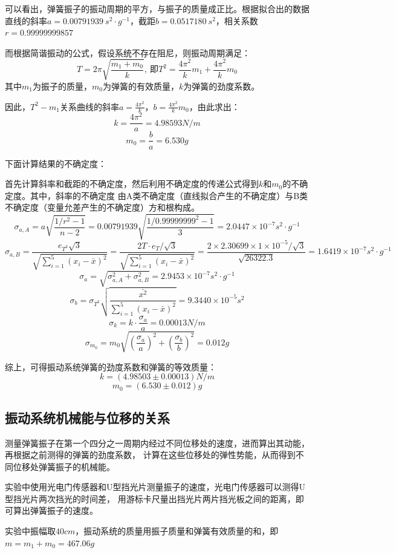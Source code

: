 \documentclass{article}
\begin{document}
    可以看出，弹簧振子的振动周期的平方，与振子的质量成正比。根据拟合出的数据直线的斜率$a=0.00791939\ s^2\cdot g^{-1}$，截距$b=0.0517180\ s^2$，相关系数$r=0.99999999857$

    而根据简谐振动的公式，假设系统不存在阻尼，则振动周期满足：
    $$T=2\pi \sqrt{\frac{m_1+m_0}{k}},\ \text{即}T^2=\frac{4\pi^2}{k}m_1+\frac{4\pi^2}{k}m_0$$
    其中$m_1$为振子的质量，$m_0$为弹簧的有效质量，$k$为弹簧的劲度系数。

    因此，$T^2-m_1$关系曲线的斜率$a=\frac{4\pi^2}{k}$，$b=\frac{4\pi^2}{k}m_0$，由此求出：
    $$k=\frac{4\pi^2}{a}=4.98593N/m$$
    $$m_0=\frac{b}{a}=6.530g$$

    下面计算结果的不确定度：

    首先计算斜率和截距的不确定度，然后利用不确定度的传递公式得到$k$和$m_0$的不确定度。其中，斜率的不确定度
    由A类不确定度（直线拟合产生的不确定度）与B类不确定度（变量允差产生的不确定度）方和根构成。
    $$\sigma_{a,A}=a\sqrt{\frac{1/r^2-1}{n-2}}=0.00791939\sqrt{\frac{1/0.99999999^2-1}{3}}=2.0447\times 10^{-7}s^2\cdot g^{-1}$$
    $$\sigma_{a,B}=\frac{e_{T^2} \sqrt{3}}{\sqrt{\sum_{i=1}^5 (x_i-\bar{x})^2}}=\frac{2T\cdot e_T/ \sqrt{3}}{\sqrt{\sum_{i=1}^5 (x_i-\bar{x})^2}}=\frac{2\times 2.30699\times 1\times 10^{-5}/\sqrt{3}}{\sqrt{26322.3}}=1.6419\times 10^{-7}s^2\cdot g^{-1}$$
    $$\sigma_a=\sqrt{\sigma_{a,A}^2+\sigma_{a,B}^2}=2.9453\times 10^{-7}s^2\cdot g^{-1}$$
    $$\sigma_b=\sigma_{T^2}\sqrt{\frac{\bar{x^2}}{\sum_{i=1}^5 (x_i-\bar{x})^2}}=9.3440\times 10^{-5}s^2$$
    $$\sigma_k=k\cdot \frac{\sigma_a}{a}=0.00013N/m$$
    $$\sigma_{m_0}=m_0\sqrt{(\frac{\sigma_a}{a})^2+(\frac{\sigma_b}{b})^2}=0.012g$$

    综上，可得振动系统弹簧的劲度系数和弹簧的等效质量：
    $$k=(4.98503\pm 0.00013)N/m$$
    $$m_0=(6.530\pm 0.012)g$$
    
    \subsection{振动系统机械能与位移的关系}
    测量弹簧振子在第一个四分之一周期内经过不同位移处的速度，进而算出其动能，再根据之前测得的弹簧的劲度系数，
    计算在这些位移处的弹性势能，从而得到不同位移处弹簧振子的机械能。

    实验中使用光电门传感器和U型挡光片测量振子的速度，光电门传感器可以测得U型挡光片两次挡光的时间差，
    用游标卡尺量出挡光片两片挡光板之间的距离，即可算出弹簧振子的速度。

    实验中振幅取$40cm$，振动系统的质量用振子质量和弹簧有效质量的和，即$m=m_1+m_0=467.06g$
\end{document}

